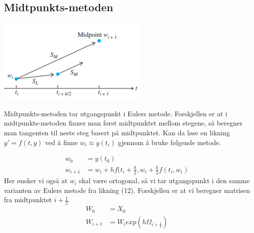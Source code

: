 \subsection{Midtpunkts-metoden}
\begin{center}
    \includegraphics{rapport/metode/bilder/midpoint.PNG}
\end{center}
Midtpunkts-metoden tar utgangspunkt i Eulers metode. Forskjellen er at i midtpunkts-metoden finner man først midtpunktet mellom stegene, så beregner man tangenten til neste steg basert på midtpunktet.\newline\newline
Kan da løse en likning $y' = f(t, y)$ ved å finne $w_i \approx y(t_i)$ gjennom å bruke følgende metode.

\begin{equation}
\begin{aligned}
    w_0&=y(t_0)\\
    w_{i+1}&=w_i + hf(t_i+\frac{h}{2}, w_i+\frac{h}{2}f(t_i, w_i)
\end{aligned}
\end{equation}
Her ønsker vi også at $w_i$ skal være ortogonal, så vi tar utgangspunkt i den samme varianten av Eulers metode fra likning (12). Forskjellen er at vi beregner matrisen fra midtpunktet $i+\frac{1}{2}$.
\begin{equation}
\begin{aligned}
    W_0&=X_0\\
    W_{i+1}&=W_iexp(h\Omega_{i+\frac{1}{2}})
\end{aligned}
\end{equation}


